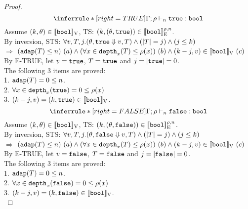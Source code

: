 \documentclass[a4paper,11pt]{article}
\theoremstyle{definition}
\begin{document}
\begin{proof}
\[
    \inferrule*[right = TRUE]{
    }{
      \Gamma; \dmap \tvdash{\nnatA} \etrue: \tbool
    }
\]
Assume $ (k, \theta) \in [\![ \mathtt{bool} ]\!]_{\text{V}} $, TS: $(k, (\theta, \mathtt{true})) \in [\![ \mathtt{bool} ]\!]_{\text{E}}^{\rho, n}$.\\
%
By inversion, STS: $\forall v, T, j. (\theta, \mathtt{true} \mathrel{\Downarrow} v, T) \land (|T| = j) \land (j \leq k) $\\
$\Rightarrow$ 
$ (\mathtt{adap}(T) \leq n) ~ (a) 
\land (\forall x \in \mathtt{depth}_{x}(T) \leq \rho(x)) ~ (b)
\land (k - j, v) \in [\![ \mathtt{bool} ]\!]_{\text{V}} ~ (c)$\\
%
By E-TRUE, let $v = \mathtt{true}$, $T = \mathtt{true}$ and $j = |\mathtt{true}| = 0$.\\
%
The following 3 items are proved:\\
%
1. $\mathtt{adap}(T) = 0 \leq n$.\\
2. $\forall x \in \mathtt{depth}_{x}(\mathtt{true}) = 0 \leq \rho(x)$\\
3. $(k - j, v) = (k, \mathtt{true}) \in [\![ \mathtt{bool} ]\!]_{\text{V}}$.\\



\[
    \inferrule*[right = FALSE]{
    }{
      \Gamma; \dmap \tvdash{\nnatA} \efalse: \tbool
    }
\]
Assume $ (k, \theta) \in [\![ \mathtt{bool} ]\!]_{\text{V}} $, TS: $(k, (\theta, \mathtt{false})) \in [\![ \mathtt{bool} ]\!]_{\text{E}}^{\rho, n}$.\\
%
By inversion, STS: $\forall v, T, j. (\theta, \mathtt{false} \mathrel{\Downarrow} v, T) \land (|T| = j) \land (j \leq k) $\\
$\Rightarrow$ 
$ (\mathtt{adap}(T) \leq n) ~ (a) 
\land (\forall x \in \mathtt{depth}_{x}(T) \leq \rho(x)) ~ (b)
\land (k - j, v) \in [\![ \mathtt{bool} ]\!]_{\text{V}} ~ (c)$\\
%
By E-TRUE, let $v = \mathtt{false}$, $T = \mathtt{false}$ and $j = |\mathtt{false}| = 0$.\\
%
The following 3 items are proved:\\
%
1. $\mathtt{adap}(T) = 0 \leq n$.\\
2. $\forall x \in \mathtt{depth}_{x}(\mathtt{false}) = 0 \leq \rho(x)$\\
3. $(k - j, v) = (k, \mathtt{false}) \in [\![ \mathtt{bool} ]\!]_{\text{V}}$.\\



\end{proof}
\end{document}
